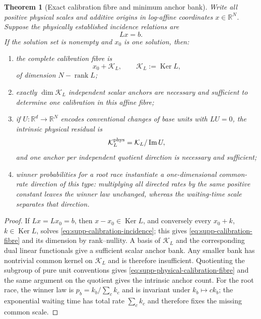 \documentclass[11pt]{article}
\newtheorem{theorem}{Theorem}[section]
\numberwithin{equation}{section}
\theoremstyle{definition}
\theoremstyle{remark}
\newcommand{\rank}{\operatorname{rank}}
\newcommand{\Ker}{\operatorname{Ker}}
\begin{document}
\begin{theorem}[Exact calibration fibre and minimum anchor bank]
\label{thm:supp-calibration-fibre}
Write all positive physical scales and additive origins in log-affine
coordinates $x\in\mathbb R^N$.  Suppose the physically established incidence
relations are
\begin{equation}
 Lx=b.
 \label{eq:supp-calibration-incidence}
\end{equation}
If the solution set is nonempty and $x_0$ is one solution, then:
\begin{enumerate}[label=\textup{(K\arabic*)},leftmargin=3em]
\item the complete calibration fibre is
      \begin{equation}
       x_0+\mathcal K_L,
       \qquad \mathcal K_L:=\Ker L,
       \label{eq:supp-calibration-fibre}
      \end{equation}
      of dimension $N-\rank L$;
\item exactly $\dim\mathcal K_L$ independent scalar anchors are necessary and
      sufficient to determine one calibration in this affine fibre;
\item if $U:\mathbb R^d\to\mathbb R^N$ encodes conventional changes of base
      units with $LU=0$, the intrinsic physical residual is
      \begin{equation}
       \mathcal K_L^{\rm phys}
       =\mathcal K_L/\operatorname{Im}U,
       \label{eq:supp-physical-calibration-fibre}
      \end{equation}
      and one anchor per independent quotient direction is necessary and
      sufficient;
\item winner probabilities for a root race instantiate a one-dimensional
      common-rate direction of this type: multiplying all directed rates by the
      same positive constant leaves the winner law unchanged, whereas the
      waiting-time scale separates that direction.
\end{enumerate}
\end{theorem}

\begin{proof}
If $Lx=Lx_0=b$, then $x-x_0\in\Ker L$, and conversely every
$x_0+k$, $k\in\Ker L$, solves \eqref{eq:supp-calibration-incidence}; this gives
\eqref{eq:supp-calibration-fibre} and its dimension by rank--nullity.  A basis
of $\mathcal K_L$ and the corresponding dual linear functionals give a
sufficient scalar anchor bank.  Any smaller bank has nontrivial common kernel
on $\mathcal K_L$ and is therefore insufficient.  Quotienting the subgroup of
pure unit conventions gives
\eqref{eq:supp-physical-calibration-fibre} and the same argument on the quotient
gives the intrinsic anchor count.  For the root race, the winner law is
$p_b=k_b/\sum_ck_c$ and is invariant under $k_b\mapsto ck_b$; the exponential
waiting time has total rate $\sum_ck_c$ and therefore fixes the missing common
scale.
\end{proof}
\end{document}
